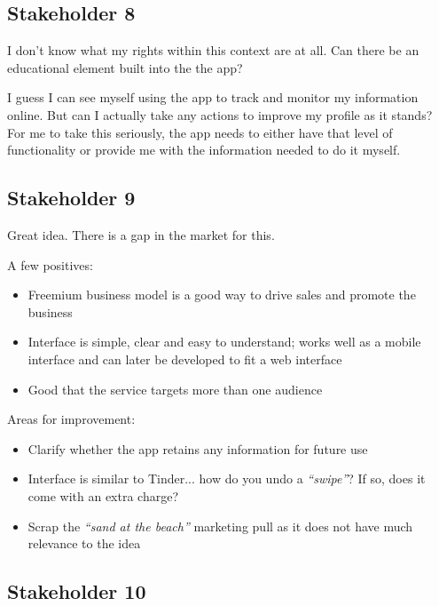   \subsection{Stakeholder 8}
	
	I don't know what my rights within this context are at all. Can there be an educational element built into the the app? 
	
	I guess I can see myself using the app to track and monitor my information online. But can I actually take any actions to improve my profile as it stands? For me to take this seriously, the app needs to either have that level of functionality or provide me with the information needed to do it myself.
	
	\subsection{Stakeholder 9}
	
	Great idea. There is a gap in the market for this.
	
	A few positives:
      \begin{itemize}
        \item Freemium business model is a good way to drive sales and promote the business
        \item Interface is simple, clear and easy to understand; works well as a mobile interface and can later be developed to fit a web interface
        \item Good that the service targets more than one audience
      \end{itemize}
	
	Areas for improvement:
      \begin{itemize}
        \item Clarify whether the app retains any information for future use
        \item Interface is similar to Tinder... how do you undo a \emph{``swipe''}? If so, does it come with an extra charge?
        \item Scrap the \emph{``sand at the beach''} marketing pull as it does not have much relevance to the idea
      \end{itemize}
		
		\subsection{Stakeholder 10}
	
